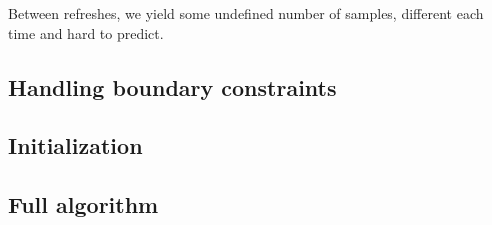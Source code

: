 Between refreshes, we yield some undefined number of samples, different each
time and hard to predict.

\subsection{Handling boundary constraints} \label{ss:constraints}

\subsection{Initialization} \label{ss:initialization}

\subsection{Full algorithm} \label{ss:algo}

